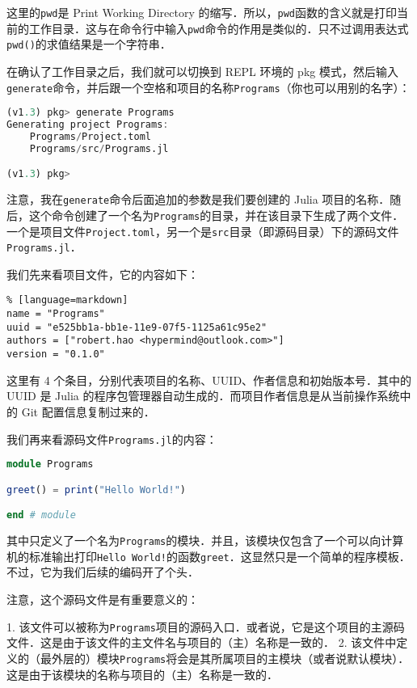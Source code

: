 这里的\verb|pwd|是 Print Working Directory 的缩写．所以，\verb|pwd|函数的含义就是打印当前的工作目录．这与在命令行中输入\verb|pwd|命令的作用是类似的．只不过调用表达式\verb|pwd()|的求值结果是一个字符串．

在确认了工作目录之后，我们就可以切换到 REPL 环境的 pkg 模式，然后输入\verb|generate|命令，并后跟一个空格和项目的名称\verb|Programs|（你也可以用别的名字）：

\begin{lstlisting}[language=julia]
(v1.3) pkg> generate Programs
Generating project Programs:
    Programs/Project.toml
    Programs/src/Programs.jl

(v1.3) pkg> 
\end{lstlisting}

注意，我在\verb|generate|命令后面追加的参数是我们要创建的 Julia 项目的名称．随后，这个命令创建了一个名为\verb|Programs|的目录，并在该目录下生成了两个文件．一个是项目文件\verb|Project.toml|，另一个是\verb|src|目录（即源码目录）下的源码文件\verb|Programs.jl|．

我们先来看项目文件，它的内容如下：

\begin{lstlisting}% [language=markdown]
name = "Programs"
uuid = "e525bb1a-bb1e-11e9-07f5-1125a61c95e2"
authors = ["robert.hao <hypermind@outlook.com>"]
version = "0.1.0"
\end{lstlisting}

这里有 4 个条目，分别代表项目的名称、UUID、作者信息和初始版本号．其中的 UUID 是 Julia 的程序包管理器自动生成的．而项目作者信息是从当前操作系统中的 Git 配置信息复制过来的．

我们再来看源码文件\verb|Programs.jl|的内容：

\begin{lstlisting}[language=julia]
module Programs

greet() = print("Hello World!")

end # module
\end{lstlisting}

其中只定义了一个名为\verb|Programs|的模块．并且，该模块仅包含了一个可以向计算机的标准输出打印\verb|Hello World!|的函数\verb|greet|．这显然只是一个简单的程序模板．不过，它为我们后续的编码开了个头．

注意，这个源码文件是有重要意义的：

1. 该文件可以被称为\verb|Programs|项目的源码入口．或者说，它是这个项目的主源码文件．这是由于该文件的主文件名与项目的（主）名称是一致的．
2. 该文件中定义的（最外层的）模块\verb|Programs|将会是其所属项目的主模块（或者说默认模块）．这是由于该模块的名称与项目的（主）名称是一致的．

